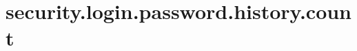 \section{security.login.password.history.count}
\label{configuration:SecurityLoginPasswordHistoryCount}
\AvailableInJavaOnly{\TODO}